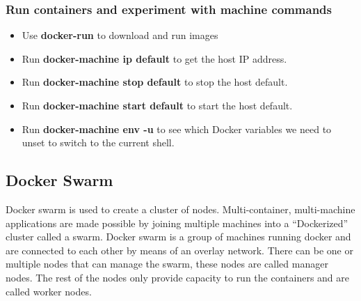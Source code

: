\documentclass[12pt]{article}
\begin{document}
\subsubsection{Run containers and experiment with machine commands}
\begin{itemize}
	\item Use \textbf{docker-run} to download and run images
	\item Run \textbf{docker-machine ip default} to get the host IP address.
	\item Run \textbf{docker-machine stop default} to stop the host default.
	\item Run \textbf{docker-machine start default} to start the host default.
	\item Run \textbf{docker-machine env -u} to see which Docker variables we need to unset to switch to the current shell.
\end{itemize}
\subsection{Docker Swarm}
Docker swarm is used to create a cluster of nodes. Multi-container, multi-machine applications are made possible by joining multiple machines into a “Dockerized” cluster called a swarm. Docker swarm is a group of machines running docker and are connected to each other by means of an overlay network. There can be one or multiple nodes that can manage the swarm, these nodes are called manager nodes. The rest of the nodes only provide capacity to run the containers and are called worker nodes. 
\end{document}
